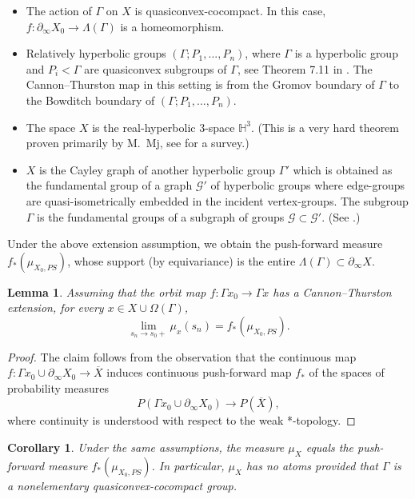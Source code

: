 \documentclass[12pt]{amsbook}%
\newtheorem{lem}[thm]{Lemma}
\newtheorem{cor}[thm]{Corollary}
\theoremstyle{definition}
\theoremstyle{remark}
\numberwithin{section}{chapter}
\numberwithin{subsection}{section}
\numberwithin{figure}{chapter}
\def\bH{{\mathbb{H}}}
\def\Ga{\Gamma}
\def\geo{\partial_\infty}
\begin{document}
{{\begin{itemize}
\item The action of $\Ga$ on $X$ is  quasiconvex-cocompact. In this case, $f: \geo X_0\to \Lambda(\Ga)$ is a homeomorphism. 

\item {Relatively hyperbolic groups $(\Ga; P_1,...,P_n)$, where $\Ga$ is a hyperbolic group and $P_i< \Ga$ are quasiconvex subgroups of $\Ga$, 
see Theorem 7.11 in \cite{Bowditch-RH}. The Cannon--Thurston map in this setting is from the Gromov boundary of $\Ga$ to the Bowditch boundary 
of $(\Ga; P_1,...,P_n)$.}

\item The space $X$ is the real-hyperbolic 3-space $\bH^3$. (This is a very hard theorem proven primarily by M.~Mj, see \cite{Mj} for a survey.) 

\item $X$ is the Cayley graph of another hyperbolic group $\Gamma'$ which is obtained as the fundamental group of a graph ${\mathcal G}'$ of hyperbolic groups where edge-groups are quasi-isometrically embedded in the incident vertex-groups. The subgroup $\Gamma$ is the fundamental groups of a subgraph of groups ${\mathcal G}\subset {\mathcal G}'$. (See \cite{Kapovich-Sardar}.) 
\end{itemize}


\noindent Under the above extension assumption, we obtain the push-forward measure $f_*(\mu_{X_0,PS})$, whose support (by equivariance) is the entire  $\Lambda(\Gamma)\subset \geo X$. 

\begin{lem}\label{lem:CT}
Assuming that the orbit map $f: \Ga x_0\to \Ga x$ has a Cannon--Thurston extension, 
for every $x\in X\cup \Omega(\Ga)$, 
$$
\lim_{s_n\to s_0+} \mu_x(s_n)= f_*(\mu_{X_0,PS}).$$ 
\end{lem}
\begin{proof} The claim follows from the observation that the continuous map $f: \Gamma x_0 \cup \geo X_0\to \overline{X}$ induces continuous push-forward map $f_*$ of the spaces of probability measures 
$$
P(\Gamma x_0 \cup \geo X_0)\to P(\overline{X}),$$
where continuity is understood with respect to the weak *-topology. \end{proof}  

\begin{cor}\label{cor:CT}
Under the same assumptions, the measure $\mu_{X}$ equals the push-forward measure 
$f_*(\mu_{X_0,PS})$. In particular, $\mu_{X}$ has no atoms provided that $\Gamma$ is a nonelementary  quasiconvex-cocompact group. 
\end{cor}




}}
\end{document}
